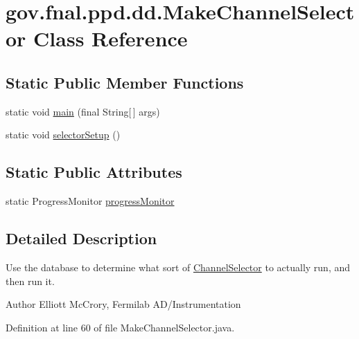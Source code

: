 \hypertarget{classgov_1_1fnal_1_1ppd_1_1dd_1_1MakeChannelSelector}{\section{gov.\-fnal.\-ppd.\-dd.\-Make\-Channel\-Selector Class Reference}
\label{classgov_1_1fnal_1_1ppd_1_1dd_1_1MakeChannelSelector}
}
\subsection*{Static Public Member Functions}
\begin{DoxyCompactItemize}
\item 
static void \hyperlink{classgov_1_1fnal_1_1ppd_1_1dd_1_1MakeChannelSelector_aaf4e3abca1a3a8aa98074f5e4062f218}{main} (final String\mbox{[}$\,$\mbox{]} args)
\item 
static void \hyperlink{classgov_1_1fnal_1_1ppd_1_1dd_1_1MakeChannelSelector_a502a66a05b0e8c4c9db06065468debf7}{selector\-Setup} ()
\end{DoxyCompactItemize}
\subsection*{Static Public Attributes}
\begin{DoxyCompactItemize}
\item 
static Progress\-Monitor \hyperlink{classgov_1_1fnal_1_1ppd_1_1dd_1_1MakeChannelSelector_a2e1e2b8a0cc313913c6bd4a27307ac3b}{progress\-Monitor}
\end{DoxyCompactItemize}


\subsection{Detailed Description}
Use the database to determine what sort of \hyperlink{classgov_1_1fnal_1_1ppd_1_1dd_1_1ChannelSelector}{Channel\-Selector} to actually run, and then run it.

\begin{DoxyAuthor}{Author}
Elliott Mc\-Crory, Fermilab A\-D/\-Instrumentation 
\end{DoxyAuthor}


Definition at line 60 of file Make\-Channel\-Selector.\-java.



